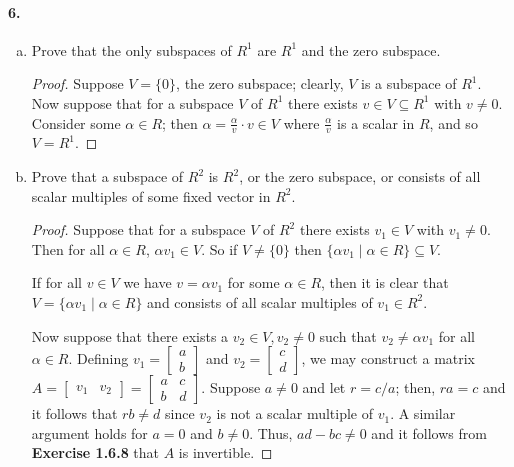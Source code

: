 \documentclass{article}
\begin{document}
\paragraph{6.}
\begin{enumerate}[(a)]
  \item Prove that the only subspaces of $R^1$ are $R^1$ and the zero subspace.
    \begin{proof}
      Suppose $V = \{0\}$, the zero subspace; clearly, $V$ is a subspace of
      $R^1$. Now suppose that for a subspace $V$ of $R^1$ there exists $v \in
      V \subseteq R^1$ with $v \neq 0$. Consider some $\alpha \in R$; then
      $\alpha = \frac{\alpha}{v} \cdot v \in V$ where $\frac{\alpha}{v}$ is a
      scalar in $R$, and so $V = R^1$.
    \end{proof}
  \item Prove that a subspace of $R^2$ is $R^2$, or the zero subspace, or
    consists of all scalar multiples of some fixed vector in $R^2$.
    \begin{proof}
      Suppose that for a subspace $V$ of $R^2$ there exists $v_1 \in V$ with
      $v_1 \neq 0$. Then for all $\alpha \in R$, $\alpha v_1 \in V$. So if $V
      \neq \{0\}$ then $\{\alpha v_1 \mid \alpha \in R\} \subseteq V$.

      If for all $v \in V$ we have $v = \alpha v_1$ for some $\alpha \in R$,
      then it is clear that $V = \{\alpha v_1 \mid \alpha \in R\}$ and consists
      of all scalar multiples of $v_1 \in R^2$.

      Now suppose that there exists a $v_2 \in V, v_2 \neq 0$ such that $v_2
      \neq \alpha v_1$ for all $\alpha \in R$. Defining $v_1 = \begin{bmatrix}
        a \\
        b
      \end{bmatrix}$ and $v_2 = \begin{bmatrix}
        c \\
        d
      \end{bmatrix}$, we may construct a matrix $A = \begin{bmatrix}
        v_1 & v_2
      \end{bmatrix}
      = \begin{bmatrix}
        a & c \\
        b & d
      \end{bmatrix}$. Suppose $a \neq 0$ and let $r = c/a$; then, $ra = c$ and
      it follows that $rb \neq d$ since $v_2$ is not a scalar multiple of $v_1$.
      A similar argument holds for $a = 0$ and $b \neq 0$. Thus, $ad - bc \neq
      0$ and it follows from \textbf{Exercise 1.6.8} that $A$ is invertible.


\end{proof}
\end{enumerate}
\end{document}
